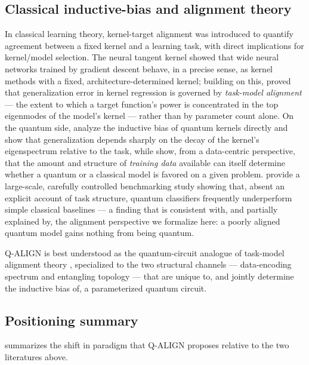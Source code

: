 \documentclass[11pt]{article}
\begin{document}
\subsection{Classical inductive-bias and alignment theory}
In classical learning theory, kernel-target alignment \citep{cristianini2001kernel} was introduced to quantify agreement between a fixed kernel and a learning task, with direct implications for kernel/model selection. The neural tangent kernel \citep{jacot2018neural} showed that wide neural networks trained by gradient descent behave, in a precise sense, as kernel methods with a fixed, architecture-determined kernel; building on this, \citet{canatar2021spectral} proved that generalization error in kernel regression is governed by \emph{task-model alignment} --- the extent to which a target function's power is concentrated in the top eigenmodes of the model's kernel --- rather than by parameter count alone. On the quantum side, \citet{kubler2021inductive} analyze the inductive bias of quantum kernels directly and show that generalization depends sharply on the decay of the kernel's eigenspectrum relative to the task, while \citet{huang2021power} show, from a data-centric perspective, that the amount and structure of \emph{training data} available can itself determine whether a quantum or a classical model is favored on a given problem. \citet{bowles2024better} provide a large-scale, carefully controlled benchmarking study showing that, absent an explicit account of task structure, quantum classifiers frequently underperform simple classical baselines --- a finding that is consistent with, and partially explained by, the alignment perspective we formalize here: a poorly aligned quantum model gains nothing from being quantum.

Q-ALIGN is best understood as the quantum-circuit analogue of task-model alignment theory \citep{canatar2021spectral,cristianini2001kernel}, specialized to the two structural channels --- data-encoding spectrum and entangling topology --- that are unique to, and jointly determine the inductive bias of, a parameterized quantum circuit.

\subsection{Positioning summary}
 summarizes the shift in paradigm that Q-ALIGN proposes relative to the two literatures above.
\end{document}

